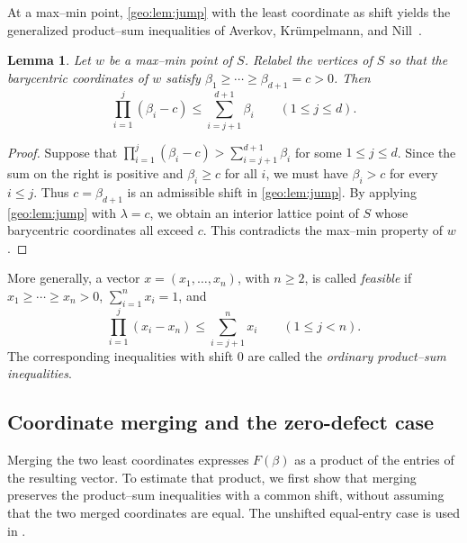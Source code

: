 \documentclass[reqno, 11pt]{article}
\numberwithin{equation}{section}
\newtheorem{lemma}[lemma]{Lemma}
\theoremstyle{definition}
\begin{document}
At a max--min point, \cref{geo:lem:jump} with the least coordinate as
shift yields the generalized product--sum inequalities of Averkov,
Kr\"umpelmann, and Nill~\cite[Theorem~2.2]{AKN2020}.

\begin{lemma}\label{geo:lem:strong}
Let $w$ be a max--min point of $S$.
Relabel the vertices of $S$ so that the barycentric coordinates of $w$
satisfy $\beta_1\ge\cdots\ge\beta_{d+1}=c>0$. Then
\begin{equation}\label{geo:eq:strong-ps}
\prod_{i=1}^{j}(\beta_i-c)
\le \sum_{i=j+1}^{d+1}\beta_i
\qquad (1\le j\le d).
\end{equation}
\end{lemma}
\begin{proof}
Suppose that $\prod_{i=1}^j(\beta_i-c)>\sum_{i=j+1}^{d+1}\beta_i$ for some $1\le j\le d$.
Since the sum on the right is positive and $\beta_i\ge c$ for all $i$, we must have $\beta_i>c$ for every $i\le j$. Thus $c=\beta_{d+1}$ is an admissible shift in \cref{geo:lem:jump}. By applying \cref{geo:lem:jump} with $\lambda=c$, we obtain an interior lattice point of $S$ whose barycentric coordinates all exceed $c$. This contradicts the max--min property of $w$.
\end{proof}

More generally, a vector $x=(x_1,\ldots,x_n)$, with $n\ge2$,
is called \emph{feasible} if $x_1\ge\cdots\ge x_n>0$,
$\sum_{i=1}^n x_i=1$, and
\[
 \prod_{i=1}^j(x_i-x_n)\le\sum_{i=j+1}^n x_i
 \qquad(1\le j<n).
\]
The corresponding inequalities with shift $0$ are called the
\emph{ordinary product--sum inequalities}.



\subsection{Coordinate merging and the zero-defect case}

Merging the two least coordinates expresses $F(\beta)$ as a product
of the entries of the resulting vector. To estimate that product, we first show that merging preserves the product–sum inequalities with a common shift, without assuming that the two merged coordinates are equal. The unshifted equal-entry case is used in
\cite[proof of Lemma~5.6, Part~III]{Nill07}.
\end{document}
